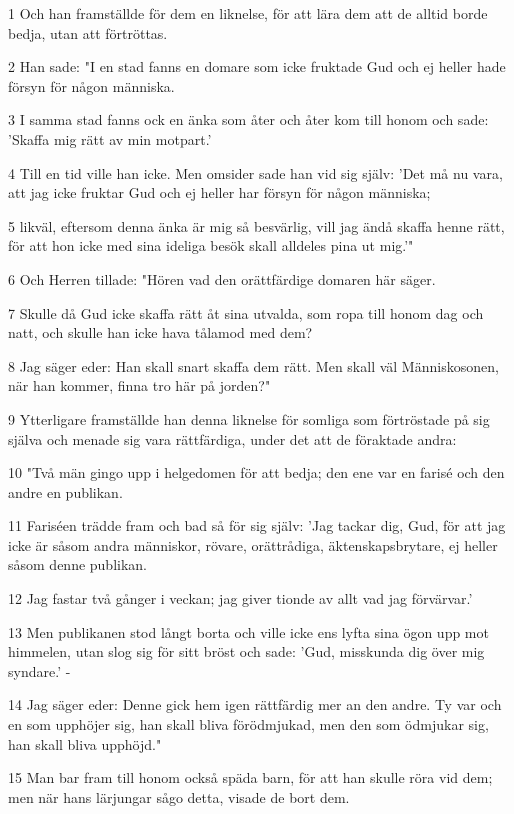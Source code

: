 \par 1 Och han framställde för dem en liknelse, för att lära dem att de alltid borde bedja, utan att förtröttas.
\par 2 Han sade: "I en stad fanns en domare som icke fruktade Gud och ej heller hade försyn för någon människa.
\par 3 I samma stad fanns ock en änka som åter och åter kom till honom och sade: 'Skaffa mig rätt av min motpart.'
\par 4 Till en tid ville han icke. Men omsider sade han vid sig själv: 'Det må nu vara, att jag icke fruktar Gud och ej heller har försyn för någon människa;
\par 5 likväl, eftersom denna änka är mig så besvärlig, vill jag ändå skaffa henne rätt, för att hon icke med sina ideliga besök skall alldeles pina ut mig.'"
\par 6 Och Herren tillade: "Hören vad den orättfärdige domaren här säger.
\par 7 Skulle då Gud icke skaffa rätt åt sina utvalda, som ropa till honom dag och natt, och skulle han icke hava tålamod med dem?
\par 8 Jag säger eder: Han skall snart skaffa dem rätt. Men skall väl Människosonen, när han kommer, finna tro här på jorden?"
\par 9 Ytterligare framställde han denna liknelse för somliga som förtröstade på sig själva och menade sig vara rättfärdiga, under det att de föraktade andra:
\par 10 "Två män gingo upp i helgedomen för att bedja; den ene var en farisé och den andre en publikan.
\par 11 Fariséen trädde fram och bad så för sig själv: 'Jag tackar dig, Gud, för att jag icke är såsom andra människor, rövare, orättrådiga, äktenskapsbrytare, ej heller såsom denne publikan.
\par 12 Jag fastar två gånger i veckan; jag giver tionde av allt vad jag förvärvar.'
\par 13 Men publikanen stod långt borta och ville icke ens lyfta sina ögon upp mot himmelen, utan slog sig för sitt bröst och sade: 'Gud, misskunda dig över mig syndare.' -
\par 14 Jag säger eder: Denne gick hem igen rättfärdig mer an den andre. Ty var och en som upphöjer sig, han skall bliva förödmjukad, men den som ödmjukar sig, han skall bliva upphöjd."
\par 15 Man bar fram till honom också späda barn, för att han skulle röra vid dem; men när hans lärjungar sågo detta, visade de bort dem.

